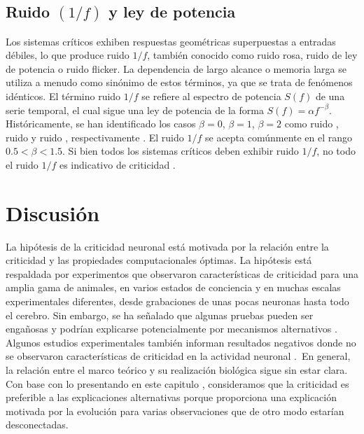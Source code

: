 \subsection{Ruido $(1/ f )$ y ley de potencia}

Los sistemas críticos exhiben respuestas geométricas superpuestas a entradas débiles, lo que produce ruido $1/f$, también conocido como ruido rosa, ruido de ley de potencia o ruido flicker. La dependencia de largo alcance o memoria larga se utiliza a menudo como sinónimo de estos términos, ya que se trata de fenómenos idénticos. El término ruido $1/f$ se refiere al espectro de potencia $S(f)$ de una serie temporal, el cual sigue una ley de potencia de la forma $S( f ) = \alpha f^{-\beta}$. Históricamente, se han identificado los casos $\beta=0$, $\beta=1$, $\beta=2$ como ruido , ruido   y ruido , respectivamente \cite{li_fractal_2005}. El ruido $1/f$ se acepta comúnmente en el rango  $0.5 < \beta < 1.5$. Si bien todos los sistemas críticos deben exhibir ruido $1/f$, no todo el ruido $1/f$ es indicativo de criticidad \cite{bedard_does_2006,hesse_self-organized_2014}. 



\section{Discusión}

La hipótesis de la criticidad neuronal está motivada por la relación entre la criticidad y las propiedades computacionales óptimas. La hipótesis está respaldada por experimentos que observaron características de criticidad para una amplia gama de animales, en varios estados de conciencia y en muchas escalas experimentales diferentes, desde grabaciones de unas pocas neuronas hasta todo el cerebro.  Sin embargo, se ha señalado que algunas pruebas pueden ser engañosas \cite{clauset_power-law_2009} y podrían explicarse potencialmente por mecanismos alternativos \cite{botcharova_power-law_2012,galinsky_neuronal_2023}. Algunos estudios experimentales también informan resultados negativos donde no se observaron características de criticidad en la actividad neuronal  \cite{yu_scale-invariant_2014,bedard_does_2006,dehghani_avalanche_2012}. En general, la relación entre el marco teórico y su realización biológica sigue sin estar clara.  Con base con lo presentando en este capitulo , consideramos que la criticidad es preferible a las explicaciones alternativas porque proporciona una explicación motivada por la evolución para varias observaciones que de otro modo estarían desconectadas.\\

